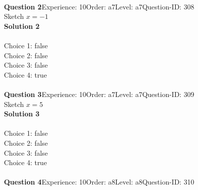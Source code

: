 \documentclass{article}
\begin{document}
\\[4pt]
\noindent\textbf{Question 2}\hspace{20pt}Experience: 10\hspace{20pt}Order: a7\hspace{20pt}Level: a7\hspace{20pt}Question-ID: 308\\[2pt]
Sketch $x=-1$\\[4pt]
\noindent\textbf{Solution 2}\\[2pt]
\\[4pt]
Choice 1: \hspace{20pt} \hspace{20pt}false\\
Choice 2: \hspace{20pt} \hspace{20pt}false\\
Choice 3: \hspace{20pt} \hspace{20pt}false\\
Choice 4: \hspace{20pt} \hspace{20pt}true\\
\\[4pt]
\noindent\textbf{Question 3}\hspace{20pt}Experience: 10\hspace{20pt}Order: a7\hspace{20pt}Level: a7\hspace{20pt}Question-ID: 309\\[2pt]
Sketch $x=5$\\[4pt]
\noindent\textbf{Solution 3}\\[2pt]
\\[4pt]
Choice 1: \hspace{20pt} \hspace{20pt}false\\
Choice 2: \hspace{20pt} \hspace{20pt}false\\
Choice 3: \hspace{20pt} \hspace{20pt}false\\
Choice 4: \hspace{20pt} \hspace{20pt}true\\
\\[4pt]
\noindent\textbf{Question 4}\hspace{20pt}Experience: 10\hspace{20pt}Order: a8\hspace{20pt}Level: a8\hspace{20pt}Question-ID: 310\\[2pt]
\end{document}
